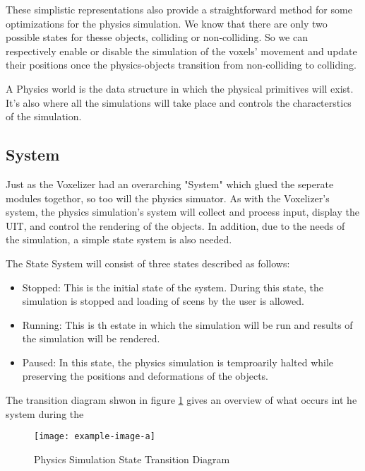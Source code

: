 These simplistic representations also provide a straightforward method for some optimizations for the physics simulation.
We know that there are only two possible states for thesse objects, colliding or non-colliding. So we can 
respectively enable or disable the simulation of the voxels' movement and update their positions once
the physics-objects transition from non-colliding to colliding.

A Physics world is the data structure in which the physical primitives will exist. It's also where all the 
simulations will take place and controls the characterstics of the simulation.

\subsection{System}

Just as the Voxelizer had an overarching "System" which glued the seperate modules togethor, so too will 
the physics simuator. As with the Voxelizer's system, the physics simulation's system will collect and
process input, display the UIT, and control the rendering of the objects. In addition, due to the needs of the 
simulation, a simple state system is also needed.

The State System will consist of three states described as follows:
\begin{itemize}
  \item Stopped: This is the initial state of the system. During this state, the simulation is stopped
        and loading of scens by the user is allowed.
  \item Running: This is th estate in which the simulation will be run and results of the simulation will be rendered.
  \item Paused: In this state, the physics simulation is temproarily halted while preserving the positions and 
        deformations of the objects.
\end{itemize}

The transition diagram shwon in figure \ref{fig:PhysicsSimulationTransitionDiagram} gives an overview of
what occurs int he system during the 

\begin{figure}[h]
  \centering
  \texttt{[image: example-image-a]}
  \caption{Physics Simulation State Transition Diagram}
  \label{fig:PhysicsSimulationTransitionDiagram}
\end{figure}




